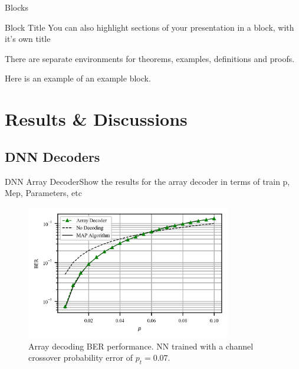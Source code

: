 \documentclass{beamer}
\begin{document}
\begin{frame}{Blocks}
\begin{block}{Block Title}
You can also highlight sections of your presentation in a block, with it's own title
\end{block}
\begin{theorem}
There are separate environments for theorems, examples, definitions and proofs.
\end{theorem}
\begin{example}
Here is an example of an example block.
\end{example}
\end{frame}


\section{Results \& Discussions}
\subsection{DNN Decoders}
\begin{frame}{DNN Array Decoder}{Show the results for the array decoder in terms of train p, Mep, Parameters, etc}
 
 \begin{figure}[!ht]
  \centering
    \includegraphics[width=0.8\textwidth]{images/MLNN_Mep_65536_ptrain_007}
    \caption{Array decoding BER performance. NN trained with a channel crossover probability error of $p_t=0.07$.}\label{fig:ArrayD}
\end{figure}
 

\end{frame}
\end{document}
